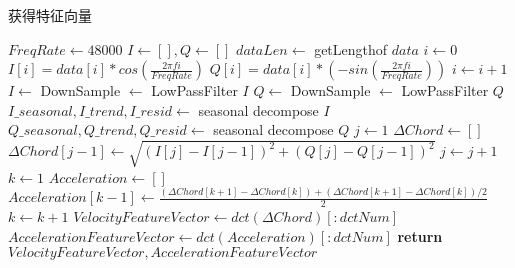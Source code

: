 \begin{algorithm}
\caption{获得特征向量}
\label{alg:get-feature-vector}
\begin{algorithmic}[1]
\State $FreqRate \gets 48000$           
\State $I \gets [], Q \gets []$  
\State $dataLen \gets$ getLengthof $data$  
\State $i \gets 0$
 
\State $I[i]=data[i]*cos(\frac{2\pi fi}{FreqRate})$
\State $Q[i]=data[i]*(-sin(\frac{2\pi fi}{FreqRate}))$
\State $i \gets i + 1$
\EndWhile\label{euclidendwhile}
\State $I \gets $ DownSample $\gets $ LowPassFilter $I$   
\State $Q \gets $ DownSample $\gets $ LowPassFilter $Q$   
\State $I\_seasonal,I\_trend,I\_resid \gets$ seasonal decompose $I$      
\State $Q\_seasonal,Q\_trend,Q\_resid \gets$ seasonal decompose $Q$  
\State $j \gets 1$
\State $\Delta Chord \gets []$
 
\State $\Delta Chord[j-1] \gets \sqrt{(I[j]-I[j-1])^{2} + (Q[j]-Q[j-1])^{2}}$
\State $j \gets j + 1$
\EndWhile\label{euclidendwhile}
\State $k \gets 1$
\State $Acceleration \gets []$
 
\State $Acceleration[k-1] \gets \frac{(\Delta Chord[k+1] - \Delta Chord[k]) + (\Delta Chord[k+1] - \Delta Chord[k])/2}{2}$
\State $k \gets k + 1$
\EndWhile\label{euclidendwhile}
\State $VelocityFeatureVector \gets dct(\Delta Chord)[:dctNum]$
\State $AccelerationFeatureVector \gets dct(Acceleration)[:dctNum]$
\State \textbf{return} $VelocityFeatureVector,AccelerationFeatureVector$
\EndProcedure
\end{algorithmic}
\end{algorithm}

